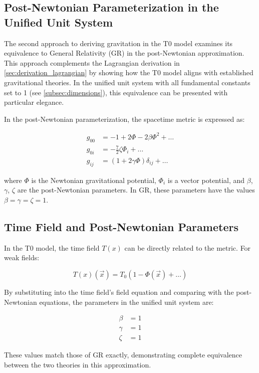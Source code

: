 \documentclass[12pt,a4paper]{article}
\newcommand{\Tfield}{T(x)}
\newcommand{\Tzero}{T_0}
\newcommand{\vecx}{\vec{x}}
\begin{document}
	\subsection{Post-Newtonian Parameterization in the Unified Unit System}
	\label{subsec:post_newtonian}
	The second approach to deriving gravitation in the T0 model examines its equivalence to General Relativity (GR) in the post-Newtonian approximation. This approach complements the Lagrangian derivation in \cref{sec:derivation_lagrangian} by showing how the T0 model aligns with established gravitational theories. In the unified unit system with all fundamental constants set to 1 (see \cref{subsec:dimensions}), this equivalence can be presented with particular elegance.
	
	In the post-Newtonian parameterization, the spacetime metric is expressed as:
	
	\begin{align}
		g_{00} &= -1 + 2\Phi - 2\beta\Phi^2 + \dots \\
		g_{0i} &= -\frac{7}{2}\zeta \Phi_i + \dots \\
		g_{ij} &= (1 + 2\gamma\Phi)\delta_{ij} + \dots
	\end{align}
	
	where \(\Phi\) is the Newtonian gravitational potential, \(\Phi_i\) is a vector potential, and \(\beta\), \(\gamma\), \(\zeta\) are the post-Newtonian parameters. In GR, these parameters have the values \(\beta = \gamma = \zeta = 1\).
	
	\subsection{Time Field and Post-Newtonian Parameters}
	In the T0 model, the time field \(\Tfield\) can be directly related to the metric. For weak fields:
	
	\begin{equation}
		\Tfield(\vecx) = \Tzero(1 - \Phi(\vecx) + \dots)
	\end{equation}
	
	By substituting into the time field's field equation and comparing with the post-Newtonian equations, the parameters in the unified unit system are:
	
	\begin{align}
		\beta &= 1 \\
		\gamma &= 1 \\
		\zeta &= 1
	\end{align}
	
	These values match those of GR exactly, demonstrating complete equivalence between the two theories in this approximation.
	
\end{document}

